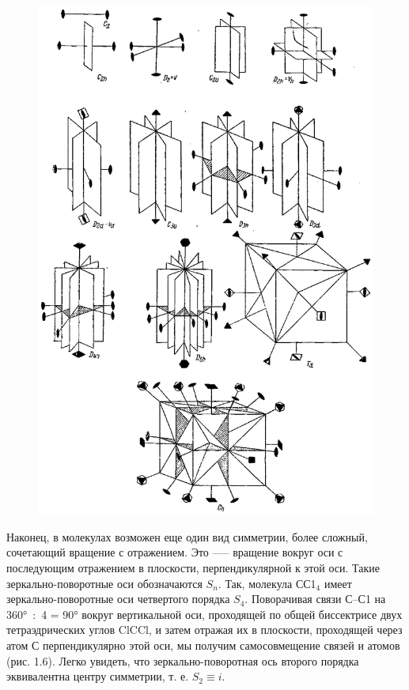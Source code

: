 \begin{figure}[tbp]
\centerline{\hbox{\includegraphics[scale=1]{Ris/ris_eps/ris1_06.eps}}}

\end{figure}
Наконец, в молекулах возможен еще один вид симметрии, более сложный, сочетающий вращение с отражением. Это --— вращение вокруг оси с последующим отражением в плоскости, перпендикулярной к этой оси. Такие зеркально-поворотные оси обозначаются $S_n$. Так,   молекула   СС1$_4$  имеет  зеркально-поворотные   оси   четвертого порядка   $S_4$. Поворачивая связи \hbox{С--С1} на 360°~:~4 = 90° вокруг вертикальной оси, проходящей по общей биссектрисе двух  тетраэдрических  углов ClCCl, и затем отражая их в плоскости, проходящей через атом С перпендикулярно этой оси, мы получим самосовмещение связей и атомов (рис. 1.6). Легко увидеть, что зеркально-поворотная ось второго порядка эквивалентна центру симметрии, т. е. $S_2\equiv i$.

